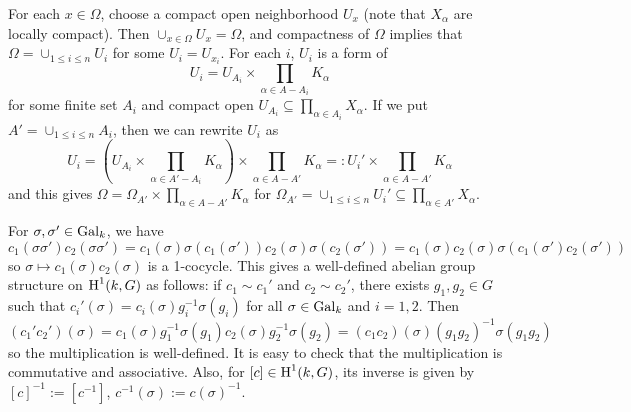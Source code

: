 \begin{problem}
For each $x \in \Omega$, choose a compact open neighborhood $U_x$ (note that $X_\alpha$ are locally compact).
Then $\cup_{x\in \Omega} U_x = \Omega$, and compactness of $\Omega$ implies that $\Omega = \cup_{1\leq i \leq n} U_i$ for some $U_i = U_{x_i}$.
For each $i$, $U_i$ is a form of
$$
U_i = U_{A_i} \times \prod_{\alpha \in A - A_i} K_{\alpha}
$$
for some finite set $A_i$ and compact open $U_{A_i} \subseteq \prod_{\alpha \in A_i}X_\alpha$.
If we put $A' = \cup_{1\leq i \leq n} A_i$, then we can rewrite $U_i$ as
$$
U_i = \left(U_{A_i} \times \prod_{\alpha \in A' - A_i} K_{\alpha}\right) \times \prod_{\alpha \in A - A'} K_\alpha =: U_{i}' \times \prod_{\alpha \in A - A'} K_\alpha
$$
and this gives $\Omega = \Omega_{A'} \times \prod_{\alpha \in A - A'} K_\alpha$ for $\Omega_{A'} = \cup_{1\leq i \leq n} U_{i}' \subseteq \prod_{\alpha \in A'} X_\alpha$.
\end{problem}


\begin{problem}
For $\sigma, \sigma'\in \operatorname{\mathrm{Gal}}_k$, we have
$$
c_1(\sigma\sigma')c_2(\sigma\sigma') = c_1(\sigma) \sigma(c_1(\sigma')) c_2(\sigma) \sigma(c_2(\sigma')) = c_1(\sigma)c_2(\sigma) \sigma(c_1(\sigma')c_2(\sigma'))
$$
so $\sigma\mapsto c_1(\sigma)c_2(\sigma)$ is a 1-cocycle.
This gives a well-defined abelian group structure on $\operatorname{\mathrm{H}}^1(k, G)$ as follows: if $c_1 \sim c_1'$ and $c_2 \sim c_2'$, there exists
$g_1, g_2\in G$ such that $c_i'(\sigma) = c_i(\sigma) g_i^{-1} \sigma(g_i)$ for all $\sigma \in \operatorname{\mathrm{Gal}}_k$ and $i=1,2$.
Then 
$$
(c_1'c_2')(\sigma) = c_1(\sigma) g_{1}^{-1}\sigma(g_1) c_2(\sigma) g_2^{-1} \sigma(g_2) = (c_1 c_2)(\sigma)(g_1g_2)^{-1} \sigma(g_1g_2)
$$
so the multiplication is well-defined. It is easy to check that the multiplication is commutative and associative.
Also, for $[c] \in \operatorname{\mathrm{H}}^1(k, G)$, its inverse is given by $[c]^{-1}:=[c^{-1}]$, $c^{-1}(\sigma):=c(\sigma)^{-1}$.
\end{problem}

\begin{problem} \notfinish
\end{problem}

\begin{problem} \notfinish
\end{problem}